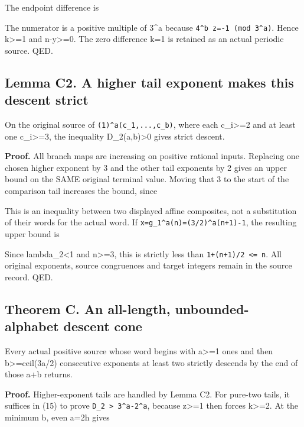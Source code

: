 The endpoint difference is


The numerator is a positive multiple of 3\^{}a because
\nolinkurl{4^b z=-1 (mod 3^a)}. Hence k\textgreater=1 and
n-y\textgreater=0. The zero difference k=1 is retained as an actual
periodic source. QED.

\subsection{Lemma C2. A higher tail exponent makes this descent strict}

On the original source of \nolinkurl{(1)^a(c_1,...,c_b)}, where each
c\_i\textgreater=2 and at least one c\_i\textgreater=3, the inequality
D\_2(a,b)\textgreater0 gives strict descent.

\textbf{Proof.} All branch maps are increasing on positive rational
inputs. Replacing one chosen higher exponent by 3 and the other tail
exponents by 2 gives an upper bound on the SAME original terminal value.
Moving that 3 to the start of the comparison tail increases the bound,
since


This is an inequality between two displayed affine composites, not a
substitution of their words for the actual word. If
\nolinkurl{x=g_1^a(n)=(3/2)^a(n+1)-1}, the resulting upper bound is


Since lambda\_2\textless1 and n\textgreater=3, this is strictly less
than \nolinkurl{1+(n+1)/2 <= n}. All original exponents, source
congruences and target integers remain in the source record. QED.

\subsection{Theorem C. An all-length, unbounded-alphabet descent cone}

Every actual positive source whose word begins with a\textgreater=1 ones
and then b\textgreater=ceil(3a/2) consecutive exponents at least two
strictly descends by the end of those a+b returns.

\textbf{Proof.} Higher-exponent tails are handled by Lemma C2. For
pure-two tails, it suffices in (15) to prove \nolinkurl{D_2 > 3^a-2^a},
because z\textgreater=1 then forces k\textgreater=2. At the minimum b,
even a=2h gives

